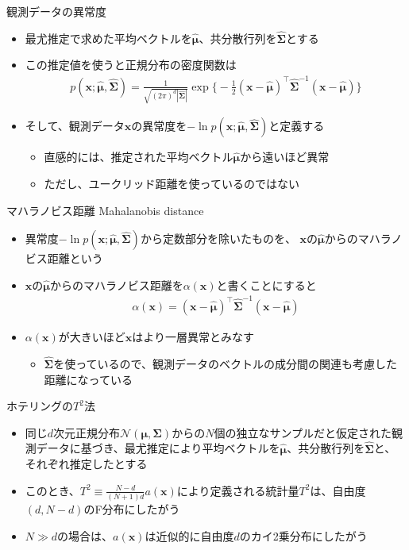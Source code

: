 \documentclass[aspectratio=169,unicode,dvipdfmx,14pt]{beamer}
\begin{document}
\begin{frame}{観測データの異常度}
\begin{itemize}
\item 最尤推定で求めた平均ベクトルを$\hat{\bm{\mu}}$、共分散行列を$\hat{\bm{\Sigma}}$とする
\item この推定値を使うと正規分布の密度関数は
\begin{align}
p(\bm{x};\hat{\bm{\mu}},\hat{\bm{\Sigma}}) = 
\frac{1}{\sqrt{(2\pi)^d|\hat{\bm{\Sigma}}|}} \exp \bigg\{
- \frac{1}{2} (\bm{x} - \hat{\bm{\mu}})^\intercal \hat{\bm{\Sigma}}^{-1}
(\bm{x} - \hat{\bm{\mu}}) \bigg\}
\end{align}
\item そして、観測データ$\bm{x}$の異常度を$-\ln p(\bm{x};\hat{\bm{\mu}},\hat{\bm{\Sigma}})$と定義する
\begin{itemize}
\item 直感的には、推定された平均ベクトル$\hat{\bm{\mu}}$から遠いほど異常
\item ただし、ユークリッド距離を使っているのではない
\end{itemize}
\end{itemize}
\end{frame}

\begin{frame}{マハラノビス距離 Mahalanobis distance}
\begin{itemize}
\item 異常度$-\ln p(\bm{x};\hat{\bm{\mu}},\hat{\bm{\Sigma}})$から定数部分を除いたものを、
$\bm{x}$の$\hat{\bm{\mu}}$からのマハラノビス距離という
\item $\bm{x}$の$\hat{\bm{\mu}}$からのマハラノビス距離を$\alpha(\bm{x})$と書くことにすると
\begin{align}
\alpha(\bm{x}) = (\bm{x} - \hat{\bm{\mu}})^\intercal \hat{\bm{\Sigma}}^{-1}
(\bm{x} - \hat{\bm{\mu}})
\end{align}
\item $\alpha(\bm{x})$が大きいほど$\bm{x}$はより一層異常とみなす
\begin{itemize}
\item $\hat{\bm{\Sigma}}$を使っているので、観測データのベクトルの成分間の関連も考慮した距離になっている
\end{itemize}
\end{itemize}
\end{frame}

\begin{frame}{ホテリングの$T^2$法}
\begin{itemize}
\item 同じ$d$次元正規分布$\mathcal{N}(\bm{\mu},\bm{\Sigma})$からの$N$個の独立なサンプルだと仮定された観測データに基づき、最尤推定により平均ベクトルを$\hat{\bm{\mu}}$、共分散行列を$\hat{\bm{\Sigma}}$と、それぞれ推定したとする
\item このとき、$T^2 \equiv \frac{N-d}{(N+1)d}a(\bm{x})$により定義される統計量$T^2$は、自由度$(d,N-d)$のF分布にしたがう
\item $N \gg d$の場合は、$a(\bm{x})$は近似的に自由度$d$のカイ2乗分布にしたがう
\end{itemize}
\end{frame}
\end{document}
